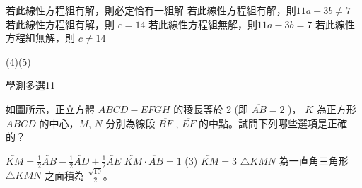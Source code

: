 \begin{QUESTIONS}
\begin{QUESTION}
\begin{QBODY}
			\begin{QOPS} 
				\QOP 若此線性方程組有解，則必定恰有一組解 
				\QOP 若此線性方程組有解，則$11a-3b \neq 7$ 
				\QOP 若此線性方程組有解，則 $c=14$  
				\QOP 若此線性方程組無解，則$11a-3b=7$ 
				\QOP 若此線性方程組無解，則 $c\neq 14$
			\end{QOPS}
        \end{QBODY}
        \begin{QFROMS}
        \end{QFROMS}
        \begin{QTAGS}\end{QTAGS}
        \begin{QANS}
            (4)(5)
        \end{QANS}
        \begin{QSOLLIST}
        \end{QSOLLIST}
        \begin{QEMPTYSPACE}
        \end{QEMPTYSPACE}
    \end{QUESTION}
    \begin{QUESTION}
        \begin{ExamInfo}{98}{學測}{多選}{11}
        \end{ExamInfo}
        \begin{ExamAnsRateInfo}{38}{70}{32}{12}
        \end{ExamAnsRateInfo}
        \begin{QBODY}
            如圖所示，正立方體 $ABCD - EFGH$ 的稜長等於 2 (即 $\overline{AB} = 2$ )， $K$ 為正方形 $ABCD $ 的中心，$M$, $N$ 分別為線段 $\overline{BF}$ ,  $\overline{EF}$ 的中點。試問下列哪些選項是正確的？ 
			\begin{QOPS} 
				\QOP  $\lvec{KM} = \frac{1}{2} \lvec{AB} - \frac{1}{2} \lvec{AD} + \frac{1}{2} \lvec{AE}$ 
				\QOP $\lvec{KM} \cdot \lvec{AB}=1$ (3) \quad $\lvec{KM}=3$ 
				\QOP  $\triangle KMN$ 為一直角三角形 
				\QOP $\triangle KMN$ 之面積為 $\frac{\sqrt{10}}{2}$。
			\end{QOPS}
			

\end{QBODY}
\end{QUESTION}
\end{QUESTIONS}
